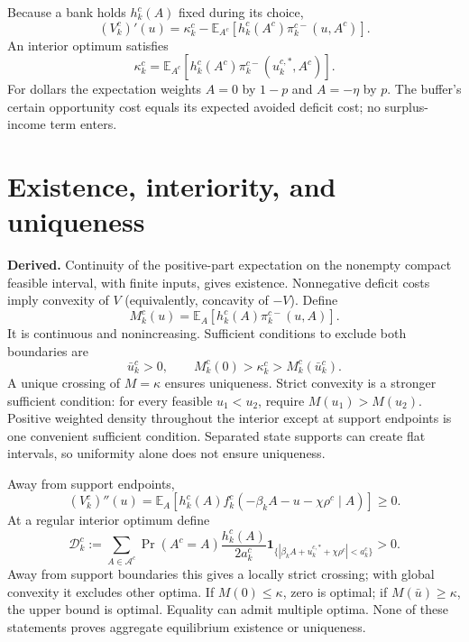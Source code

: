 \documentclass[11pt,a4paper]{article}
\newcommand{\E}{\mathbb E}
\newcommand{\ind}{\mathbf 1}
\newcommand{\der}{\textbf{Derived.}}
\begin{document}
Because a bank holds $h_k^c(A)$ fixed during its choice,
\begin{equation}
 (V_k^c)'(u)=\kappa_k^c-\E_{A^c}[h_k^c(A^c)\pi_k^{c-}(u,A^c)].
\end{equation}
An interior optimum satisfies
\begin{equation}\label{eq:foc}
 \boxed{\kappa_k^c=\E_{A^c}[h_k^c(A^c)\pi_k^{c-}(u_k^{c,*},A^c)].}
\end{equation}
For dollars the expectation weights $A=0$ by $1-p$ and $A=-\eta$ by $p$. The buffer's certain opportunity cost equals its expected avoided deficit cost; no surplus-income term enters.

\section{Existence, interiority, and uniqueness}
\der{} Continuity of the positive-part expectation on the nonempty compact feasible interval, with finite inputs, gives existence. Nonnegative deficit costs imply convexity of $V$ (equivalently, concavity of $-V$). Define
\begin{equation}
 M_k^c(u)=\E_A[h_k^c(A)\pi_k^{c-}(u,A)].
\end{equation}
It is continuous and nonincreasing. Sufficient conditions to exclude both boundaries are
\begin{equation}\label{eq:interior}
 \bar u_k^c>0,\qquad M_k^c(0)>\kappa_k^c>M_k^c(\bar u_k^c).
\end{equation}
A unique crossing of $M=\kappa$ ensures uniqueness. Strict convexity is a stronger sufficient condition: for every feasible $u_1<u_2$, require $M(u_1)>M(u_2)$. Positive weighted density throughout the interior except at support endpoints is one convenient sufficient condition. Separated state supports can create flat intervals, so uniformity alone does not ensure uniqueness.

Away from support endpoints,
\begin{equation}\label{eq:curvature}
 (V_k^c)''(u)=\E_A[h_k^c(A)f_k^c(-\beta_kA-u-\chi\rho^c\mid A)]\geq0.
\end{equation}
At a regular interior optimum define
\begin{equation}\label{eq:D}
 \mathcal D_k^c:=\sum_{A\in\mathcal A^c}\Pr(A^c=A)
 \frac{h_k^c(A)}{2a_k^c}
 \ind_{\{|\beta_kA+u_k^{c,*}+\chi\rho^c|<a_k^c\}}>0.
\end{equation}
Away from support boundaries this gives a locally strict crossing; with global convexity it excludes other optima. If $M(0)\leq\kappa$, zero is optimal; if $M(\bar u)\geq\kappa$, the upper bound is optimal. Equality can admit multiple optima. None of these statements proves aggregate equilibrium existence or uniqueness.
\end{document}
